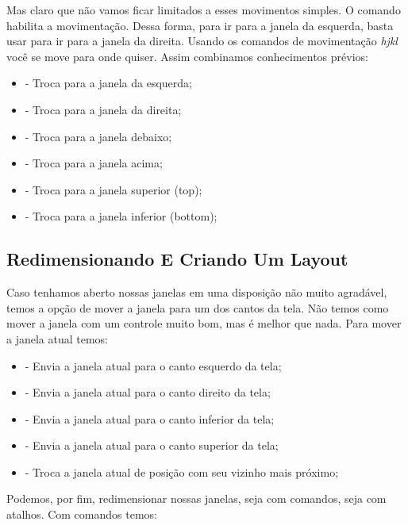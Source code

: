 Mas claro que não vamos ficar limitados a esses movimentos simples.
O comando  habilita a movimentação.
Dessa forma, para ir para a janela da esquerda, basta usar  para ir para a janela da direita.
Usando os comandos de movimentação \textit{hjkl} você se move para onde quiser.
Assim combinamos conhecimentos prévios:
\begin{itemize}
    \item {} - Troca para a janela da esquerda;
    \item {} - Troca para a janela da direita;
    \item {} - Troca para a janela debaixo;
    \item {} - Troca para a janela acima;
    \item {} - Troca para a janela superior (top);
    \item {} - Troca para a janela inferior (bottom);
\end{itemize}

\subsection{Redimensionando E Criando Um Layout}
Caso tenhamos aberto nossas janelas em uma disposição não muito agradável,
temos a opção de mover a janela para um dos cantos da tela.
Não temos como mover a janela com um controle muito bom, mas é melhor que nada.
Para mover a janela atual temos:

\begin{itemize}
    \item {} - Envia a janela atual para o canto esquerdo da tela;
    \item {} - Envia a janela atual para o canto direito da tela;
    \item {} - Envia a janela atual para o canto inferior da tela;
    \item {} - Envia a janela atual para o canto superior da tela;
    \item {} - Troca a janela atual de posição com seu vizinho mais próximo;
\end{itemize}

Podemos, por fim, redimensionar nossas janelas, seja com comandos, seja com atalhos.
Com comandos temos:

